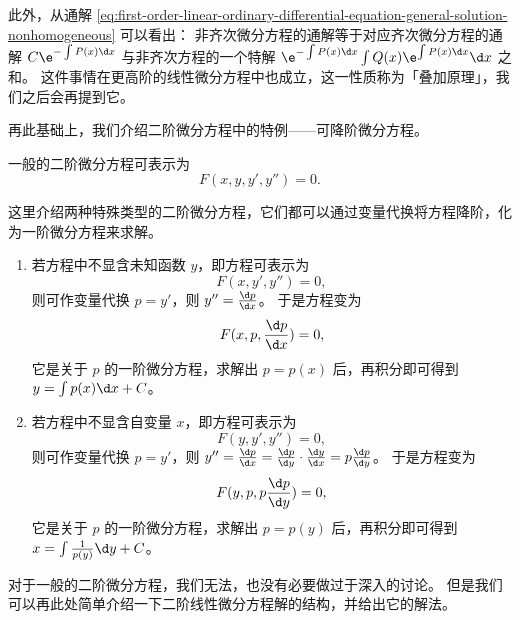 此外，从通解 \cref{eq:first-order-linear-ordinary-differential-equation-general-solution-nonhomogeneous} 可以看出：
非齐次微分方程的通解等于对应齐次微分方程的通解 $ C \e^{-\int P(x) \d x} $ 与非齐次方程的一个特解 $ \e^{-\int P(x) \d x} \int Q(x) \e^{\int P(x) \d x} \d x $ 之和。
这件事情在更高阶的线性微分方程中也成立，这一性质称为「叠加原理」，我们之后会再提到它。
\bigskip

再此基础上，我们介绍二阶微分方程中的特例——可降阶微分方程。

一般的二阶微分方程可表示为
\begin{equation}
    F(x, y, y', y'') = 0.
\end{equation}

这里介绍两种特殊类型的二阶微分方程，它们都可以通过变量代换将方程降阶，化为一阶微分方程来求解。
\begin{enumerate}
    \item 若方程中不显含未知函数 $ y $，即方程可表示为
          \begin{equation}
              F(x, y', y'') = 0,
          \end{equation}
          则可作变量代换 $ p = y' $，则 $ y'' = \frac{\d p}{\d x} $。
          于是方程变为
          \begin{equation}
              F(x, p, \frac{\d p}{\d x}) = 0,
          \end{equation}
          它是关于 $ p $ 的一阶微分方程，求解出 $ p = p(x) $ 后，再积分即可得到 $ y = \int p(x) \d x + C $。
    \item 若方程中不显含自变量 $ x $，即方程可表示为
          \begin{equation}
              F(y, y', y'') = 0,
          \end{equation}
          则可作变量代换 $ p = y' $，则 $ y'' = \frac{\d p}{\d x} = \frac{\d p}{\d y} \cdot \frac{\d y}{\d x} = p \frac{\d p}{\d y} $。
          于是方程变为
          \begin{equation}
              F(y, p, p \frac{\d p}{\d y}) = 0,
          \end{equation}
          它是关于 $ p $ 的一阶微分方程，求解出 $ p = p(y) $ 后，再积分即可得到 $ x = \int \frac{1}{p(y)} \d y + C $。
\end{enumerate}

\bigskip

对于一般的二阶微分方程，我们无法，也没有必要做过于深入的讨论。
但是我们可以再此处简单介绍一下二阶线性微分方程解的结构，并给出它的解法。


